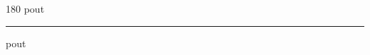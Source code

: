 
\begin{frame}
\begin{center}
\begin{turn}{180}
{\fontsize{2.5cm}{1em}\selectfont pout}
\end{turn}
\vspace{1em}\par  
\hrule
\vspace{1em}\par  
{\fontsize{2.5cm}{1em}\selectfont pout}
\end{center}
\end{frame}
